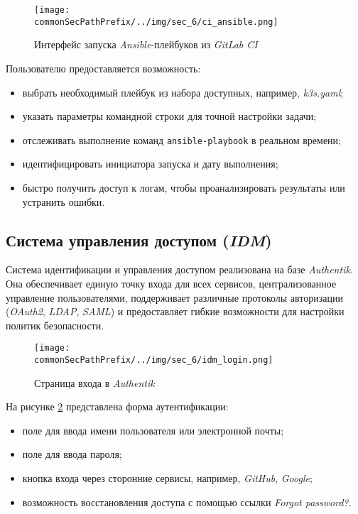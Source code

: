 \begin{figure}[ht]
    \centering
    \texttt{[image: \\commonSecPathPrefix/../img/sec\_6/ci\_ansible.png]}
    \caption{Интерфейс запуска \textit{Ansible}-плейбуков из \textit{GitLab CI}}
    \label{fig:user_guide:ci_ansible}
\end{figure}

Пользователю предоставляется возможность:
\begin{itemize}
    \item выбрать необходимый плейбук из набора доступных, например, \textit{k3s.yaml};
    \item указать параметры командной строки для точной настройки задачи;
    \item отслеживать выполнение команд \lstinline{ansible-playbook} в реальном времени;
    \item идентифицировать инициатора запуска и дату выполнения;
    \item быстро получить доступ к логам, чтобы проанализировать результаты или устранить ошибки.
\end{itemize}

\subsection{Система управления доступом (\textit{IDM})}

Система идентификации и управления доступом реализована на базе \textit{Authentik}. Она обеспечивает единую точку входа для всех сервисов, централизованное управление пользователями, поддерживает различные протоколы авторизации (\textit{OAuth2}, \textit{LDAP}, \textit{SAML}) и предоставляет гибкие возможности для настройки политик безопасности.

\begin{figure}[ht]
    \centering
    \texttt{[image: \\commonSecPathPrefix/../img/sec\_6/idm\_login.png]}
    \caption{Страница входа в \textit{Authentik}}
    \label{fig:user_guide:idm_login}
\end{figure}

На рисунке \ref{fig:user_guide:idm_login} представлена форма аутентификации:
\begin{itemize}
    \item поле для ввода имени пользователя или электронной почты;
    \item поле для ввода пароля;
    \item кнопка входа через сторонние сервисы, например, \textit{GitHub}, \textit{Google};
    \item возможность восстановления доступа с помощью ссылки \textit{Forgot password?}.
\end{itemize}

